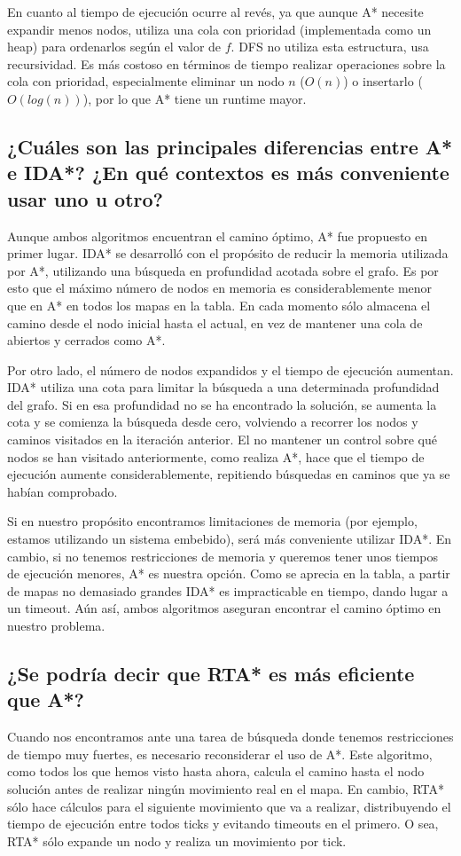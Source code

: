 \documentclass[12pt]{article} %
\begin{document}
En cuanto al tiempo de ejecución ocurre al revés, ya que aunque A* necesite expandir menos nodos, utiliza una cola con prioridad (implementada como un heap) para ordenarlos según el valor de $f$. DFS no utiliza esta estructura, usa recursividad. Es más costoso en términos de tiempo realizar operaciones sobre la cola con prioridad, especialmente eliminar un nodo $n$ ($O(n)$) o insertarlo ($O(log(n))$), por lo que A* tiene un runtime mayor.

\subsection{¿Cuáles son las principales diferencias entre A* e IDA*? ¿En qué contextos es
más conveniente usar uno u otro?}
Aunque ambos algoritmos encuentran el camino óptimo, A* fue propuesto en primer lugar. IDA* se desarrolló con el propósito de reducir la memoria utilizada por A*, utilizando una búsqueda en profundidad acotada sobre el grafo. Es por esto que el máximo número de nodos en memoria es considerablemente menor que en A* en todos los mapas en la tabla. En cada momento sólo almacena el camino desde el nodo inicial hasta el actual, en vez de mantener una cola de abiertos y cerrados como A*.

Por otro lado, el número de nodos expandidos y el tiempo de ejecución aumentan. IDA* utiliza una cota para limitar la búsqueda a una determinada profundidad del grafo. Si en esa profundidad no se ha encontrado la solución, se aumenta la cota y se comienza la búsqueda desde cero, volviendo a recorrer los nodos y caminos visitados en la iteración anterior. El no mantener un control sobre qué nodos se han visitado anteriormente, como realiza A*, hace que el tiempo de ejecución aumente considerablemente, repitiendo búsquedas en caminos que ya se habían comprobado.

Si en nuestro propósito encontramos limitaciones de memoria (por ejemplo, estamos utilizando un sistema embebido), será más conveniente utilizar IDA*. En cambio, si no tenemos restricciones de memoria y queremos tener unos tiempos de ejecución menores, A* es nuestra opción. Como se aprecia en la tabla, a partir de mapas no demasiado grandes IDA* es impracticable en tiempo, dando lugar a un timeout. Aún así, ambos algoritmos aseguran encontrar el camino óptimo en nuestro problema.

\subsection{¿Se podría decir que RTA* es más eficiente que A*?}
Cuando nos encontramos ante una tarea de búsqueda donde tenemos restricciones de tiempo muy fuertes, es necesario reconsiderar el uso de A*. Este algoritmo, como todos los que hemos visto hasta ahora, calcula el camino hasta el nodo solución antes de realizar ningún movimiento real en el mapa. En cambio, RTA* sólo hace cálculos para el siguiente movimiento que va a realizar, distribuyendo el tiempo de ejecución entre todos ticks y evitando timeouts en el primero. O sea, RTA* sólo expande un nodo y realiza un movimiento por tick.
\end{document}
